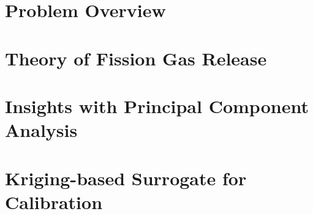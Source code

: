 \section{Problem Overview}
\label{sec:problemOverview}


\section{Theory of Fission Gas Release} 
\label{sec:fgrTheory}


\section{Insights with Principal Component Analysis}
\label{subsec:fgrPCA}


\section{Kriging-based Surrogate for Calibration}
\label{sec:fgrKriging}



